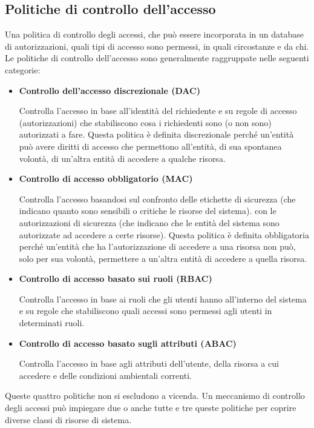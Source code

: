 \subsection{Politiche di controllo dell'accesso}
Una politica di controllo degli accessi, che può essere incorporata in un database di autorizzazioni, quali tipi di accesso sono permessi, in quali circostanze e da chi.
\singlespacing
Le politiche di controllo dell'accesso sono generalmente raggruppate nelle seguenti categorie:
\begin{itemize}
    \item \textbf{Controllo dell'accesso discrezionale (DAC)}
    
    Controlla l'accesso in base all'identità del richiedente e su regole di accesso (autorizzazioni) che stabiliscono cosa i richiedenti sono (o non sono) autorizzati a fare. Questa politica è definita discrezionale perché un'entità può avere diritti di accesso che permettono all'entità, di sua spontanea volontà, di un'altra entità di accedere a qualche risorsa.
    
    \item \textbf{Controllo di accesso obbligatorio (MAC)}
    
    Controlla l'accesso basandosi sul confronto delle etichette di sicurezza (che indicano quanto sono sensibili o critiche le risorse del sistema). con le autorizzazioni di sicurezza (che indicano che le entità del sistema sono autorizzate ad accedere a certe risorse). Questa politica è definita obbligatoria perché un'entità che ha l'autorizzazione di accedere a una risorsa non può, solo per sua volontà, permettere a un'altra entità di accedere a quella risorsa.
    
    \item \textbf{Controllo di accesso basato sui ruoli (RBAC)}
    
    Controlla l'accesso in base ai ruoli che gli utenti hanno all'interno del sistema e su regole che stabiliscono quali accessi sono permessi agli utenti in determinati ruoli.
    
    \item \textbf{Controllo di accesso basato sugli attributi (ABAC)}
    
    Controlla l'accesso in base agli attributi dell'utente, della risorsa a cui accedere e delle condizioni ambientali correnti.
\end{itemize}
\singlespacing
Queste quattro politiche non si escludono a vicenda. Un meccanismo di controllo degli accessi può impiegare due o anche tutte e tre queste politiche per coprire diverse classi di risorse di sistema.
\newpage

